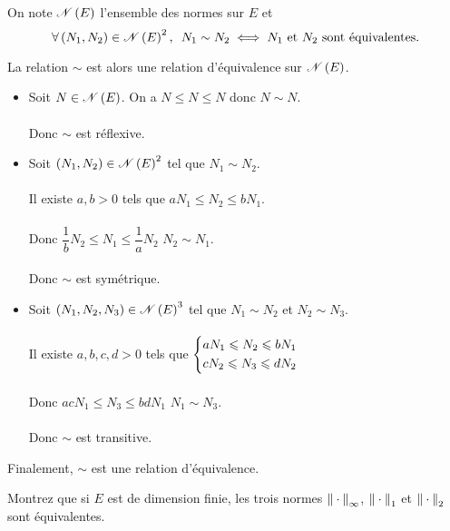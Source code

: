 \begin{prop}
On note \(\normes{E}\) l'ensemble des normes sur \(E\) et \[\quantifs{\forall\paren{N_1,N_2}\in\normes{E}^2}N_1\sim N_2\ssi N_1\text{ et }N_2\text{ sont équivalentes}.\]

La relation \(\sim\) est alors une relation d'équivalence sur \(\normes{E}\).
\end{prop}

\begin{dem}
\begin{itemize}
    \item Soit \(N\in\normes{E}\). On a \(N\leq N\leq N\) donc \(N\sim N\). \\\\ Donc \(\sim\) est réflexive. \\
    \item Soit \(\paren{N_1,N_2}\in\normes{E}^2\) tel que \(N_1\sim N_2\). \\\\ Il existe \(a,b>0\) tels que \(aN_1\leq N_2\leq bN_1\). \\\\ Donc \(\dfrac{1}{b}N_2\leq N_1\leq\dfrac{1}{a}N_2\) \ie \(N_2\sim N_1\). \\\\ Donc \(\sim\) est symétrique. \\
    \item Soit \(\paren{N_1,N_2,N_3}\in\normes{E}^3\) tel que \(N_1\sim N_2\) et \(N_2\sim N_3\). \\\\ Il existe \(a,b,c,d>0\) tels que \(\begin{dcases}
        aN_1\leq N_2\leq bN_1 \\
        cN_2\leq N_3\leq dN_2
    \end{dcases}\) \\\\ Donc \(acN_1\leq N_3\leq bdN_1\) \ie \(N_1\sim N_3\). \\\\ Donc \(\sim\) est transitive. \\
\end{itemize}

Finalement, \(\sim\) est une relation d'équivalence.
\end{dem}

\begin{exo}
Montrez que si \(E\) est de dimension finie, les trois normes \(\norme{}_\infty\), \(\norme{}_1\) et \(\norme{}_2\) sont équivalentes.
\end{exo}

